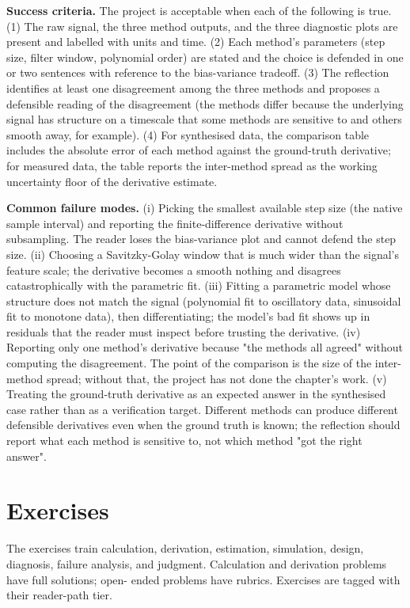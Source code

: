 \begin{project}
\textbf{Success criteria.} The project is acceptable when each of
the following is true. (1) The raw signal, the three method
outputs, and the three diagnostic plots are present and labelled
with units and time. (2) Each method's parameters (step size,
filter window, polynomial order) are stated and the choice is
defended in one or two sentences with reference to the
bias-variance tradeoff. (3) The reflection identifies at least
one disagreement among the three methods and proposes a
defensible reading of the disagreement (the methods differ
because the underlying signal has structure on a timescale that
some methods are sensitive to and others smooth away, for
example). (4) For synthesised data, the comparison table includes
the absolute error of each method against the ground-truth
derivative; for measured data, the table reports the
inter-method spread as the working uncertainty floor of the
derivative estimate.

\textbf{Common failure modes.} (i) Picking the smallest available
step size (the native sample interval) and reporting the
finite-difference derivative without subsampling. The reader
loses the bias-variance plot and cannot defend the step size.
(ii) Choosing a Savitzky-Golay window that is much wider than
the signal's feature scale; the derivative becomes a smooth
nothing and disagrees catastrophically with the parametric fit.
(iii) Fitting a parametric model whose structure does not match
the signal (polynomial fit to oscillatory data, sinusoidal fit
to monotone data), then differentiating; the model's bad fit
shows up in residuals that the reader must inspect before
trusting the derivative. (iv) Reporting only one method's
derivative because "the methods all agreed" without computing
the disagreement. The point of the comparison is the size of the
inter-method spread; without that, the project has not done the
chapter's work. (v) Treating the ground-truth derivative as an
expected answer in the synthesised case rather than as a
verification target. Different methods can produce different
defensible derivatives even when the ground truth is known; the
reflection should report what each method is sensitive to, not
which method "got the right answer".

\end{project}

\section{Exercises}

The exercises train calculation, derivation, estimation,
simulation, design, diagnosis, failure analysis, and judgment.
Calculation and derivation problems have full solutions; open-
ended problems have rubrics. Exercises are tagged with their
reader-path tier.


